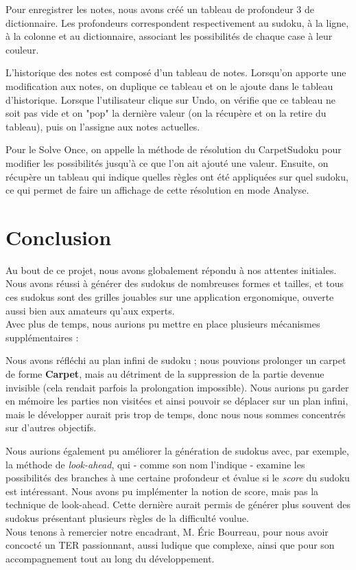 \documentclass[a4paper]{article}
\begin{document}
\begin{justify}
    Pour enregistrer les notes, nous avons créé un tableau de profondeur 3 de dictionnaire. Les profondeurs correspondent respectivement au sudoku, à la ligne, à la colonne et au dictionnaire, associant les possibilités de chaque case à leur couleur.
    
    L'historique des notes est composé d'un tableau de notes. Lorsqu'on apporte une modification aux notes, on duplique ce tableau et on le ajoute dans le tableau d'historique. Lorsque l'utilisateur clique sur Undo, on vérifie que ce tableau ne soit pas vide et on "pop" la dernière valeur (on la récupère et on la retire du tableau), puis on l'assigne aux notes actuelles.
    
    Pour le Solve Once, on appelle la méthode de résolution du CarpetSudoku pour modifier les possibilités jusqu'à ce que l'on ait ajouté une valeur. Ensuite, on récupère un tableau qui indique quelles règles ont été appliquées sur quel sudoku, ce qui permet de faire un affichage de cette résolution en mode Analyse.
\end{justify}

\newpage
\section{Conclusion}
\begin{justify}
    \qquad Au bout de ce projet, nous avons globalement répondu à nos attentes initiales. Nous avons réussi à générer des sudokus de nombreuses formes et tailles, et tous ces sudokus sont des grilles jouables sur une application ergonomique, ouverte aussi bien aux amateurs qu’aux experts. \\

    \noindent Avec plus de temps, nous aurions pu mettre en place plusieurs mécanismes supplémentaires :
    
    Nous avons réfléchi au plan infini de sudoku ; nous pouvions prolonger un carpet de forme \textbf{Carpet}, mais au détriment de la suppression de la partie devenue invisible (cela rendait parfois la prolongation impossible). Nous aurions pu garder en mémoire les parties non visitées et ainsi pouvoir se déplacer sur un plan infini, mais le développer aurait pris trop de temps, donc nous nous sommes concentrés sur d'autres objectifs.
    
    Nous aurions également pu améliorer la génération de sudokus avec, par exemple, la méthode de \textit{look-ahead}, qui - comme son nom l’indique - examine les possibilités des branches à une certaine profondeur et évalue si le \textit{score} du sudoku est intéressant. Nous avons pu implémenter la notion de score, mais pas la technique de look-ahead. Cette dernière aurait permis de générer plus souvent des sudokus présentant plusieurs règles de la difficulté voulue. \\

    Nous tenons à remercier notre encadrant, M. Éric Bourreau, pour nous avoir concocté un TER passionnant, aussi ludique que complexe, ainsi que pour son accompagnement tout au long du développement.
    
\end{justify}
\end{document}
